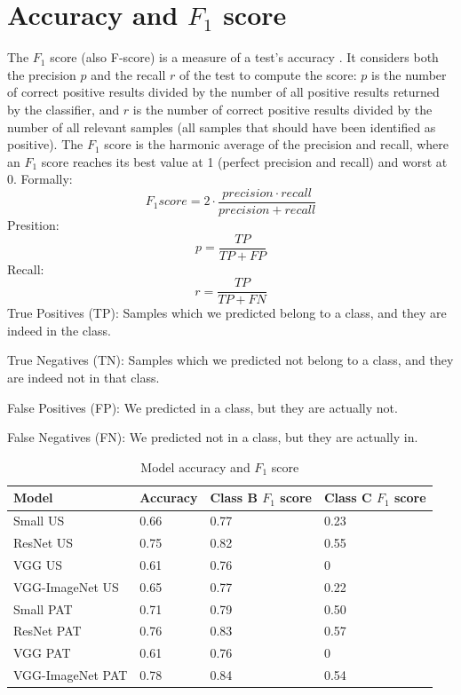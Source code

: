 \section{Accuracy and $F_1$ score}
The $F_1$ score (also F-score) is a measure of a test's accuracy \citep{powers2011evaluation}. It considers both the precision $p$ and the recall $r$ of the test to compute the score: $p$ is the number of correct positive results divided by the number of all positive results returned by the classifier, and $r$ is the number of correct positive results divided by the number of all relevant samples (all samples that should have been identified as positive). The $F_1$ score is the harmonic average of the precision and recall, where an $F_1$ score reaches its best value at 1 (perfect precision and recall) and worst at 0.
Formally: $$F_1 score = 2 \cdot \frac{precision \cdot recall}{precision + recall}$$
Presition: $$p = \frac{TP}{TP + FP}$$
Recall: $$r = \frac{TP}{TP + FN}$$
\noindent True Positives (TP): Samples which we predicted belong to a class, and they are indeed in the class.

\noindent True Negatives (TN): Samples which we predicted not belong to a class, and they are indeed not in that class.

\noindent False Positives (FP): We predicted in a class, but they are actually not.

\noindent False Negatives (FN): We predicted not in a class, but they are actually in.

\begin{table}[h]
\centering
\begin{tabular}{ |p{4cm}||p{3cm}|p{3cm}|p{3cm}|  }
 \hline
 Model       & Accuracy & Class B $F_1$ score & Class C $F_1$ score\\
 \hline
 \hline
 Small  US   & 0.66  & 0.77 &  0.23\\
 ResNet US   & 0.75  & 0.82 &  0.55\\
 VGG US      & 0.61  & 0.76 &  0\\
 VGG-ImageNet US & 0.65 & 0.77 & 0.22 \\
\hline
 Small PAT   & 0.71  & 0.79 &  0.50\\
 ResNet PAT  & 0.76  & 0.83 &  0.57\\
 VGG PAT     & 0.61  & 0.76 &  0\\
 VGG-ImageNet PAT & 0.78 & 0.84 & 0.54 \\
 \hline
\end{tabular}
\caption{Model accuracy and $F_1$ score}
\label{acctable}
\end{table}

